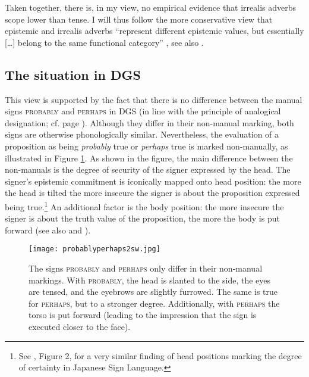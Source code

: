 \noindent Taken together, there is, in my view, no empirical evidence that irrealis adverbs scope lower than tense. I will thus follow the more conservative view that epistemic and irrealis adverbs ``represent different epistemic values, but essentially [\dots ] belong to the same functional category'' \citep[64]{nordstrom2010modality}, see also \citet{bybee1985morphology, palmer1986mood, palmer2001mood}.


\subsection{The situation in DGS}
This view is supported by the fact that there is no difference between the manual signs \textsc{probably} and \textsc{perhaps} in DGS (in line with the principle of analogical designation; cf. page \pageref{analogicaldesignation}). Although they differ in their non-manual marking, both signs are otherwise phonologically similar. Nevertheless, the evaluation of a proposition as being \textit{probably} true or \textit{perhaps} true is marked non-manually, as illustrated in Figure \ref{fig:probablyperhaps}. As shown in the figure, the main difference between the non-manuals is the degree of security of the signer expressed by the head. The signer's epistemic commitment is iconically mapped onto head position: the more the head is tilted the more insecure the signer is about the proposition expressed being true.\footnote{ See \citet[5]{matsuoka2016notes}, Figure 2, for a very similar finding of head positions marking the degree of certainty in Japanese Sign Language.} An additional factor is the body position: the more insecure the signer is about the truth value of the proposition, the more the body is put forward (see also \citealt[131, 559]{herrmann2013modal} and \citealt[131, 559]{happ2014vork}). 

\begin{figure}[bt]
\centering
	\texttt{[image: probablyperhaps2sw.jpg]}
	\caption{The signs \textsc{probably} and \textsc{perhaps} only differ in their non-manual markings. With \textsc{probably}, the head is slanted to the side, the eyes are tensed, and the eyebrows are slightly furrowed. The same is true for \textsc{perhaps}, but to a stronger degree. Additionally, with \textsc{perhaps} the torso is put forward (leading to the impression that the sign is executed closer to the face).}
	\label{fig:probablyperhaps}
\end{figure}

